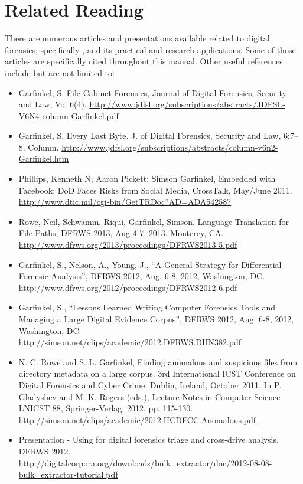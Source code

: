 \documentclass[11pt]{article} %
\begin{document}
\section{Related Reading}
There are numerous articles and presentations available related to digital forensics, specifically \bulk, and its practical and research applications. Some of those articles are specifically cited throughout this manual. Other useful references include but are not limited to:
\begin{itemize}
\item Garfinkel, S. File Cabinet Forensics, Journal of Digital Forensics, Security and Law, Vol 6(4). \url{http://www.jdfsl.org/subscriptions/abstracts/JDFSL-V6N4-column-Garfinkel.pdf}
\item Garfinkel, S. Every Last Byte. J. of Digital Forensics, Security and Law, 6:7–8. Column. \url{http://www.jdfsl.org/subscriptions/abstracts/column-v6n2-Garfinkel.htm}
\item Phillips, Kenneth N; Aaron Pickett; Simson Garfinkel, Embedded with Facebook: DoD Faces Risks from Social Media, CrossTalk, May/June 2011. \url{http://www.dtic.mil/cgi-bin/GetTRDoc?AD=ADA542587}
\item Rowe, Neil, Schwamm, Riqui, Garfinkel, Simson. Language Translation for File Paths, DFRWS 2013, Aug 4-7, 2013. Monterey, CA. \url{http://www.dfrws.org/2013/proce}\newline\url{edings/DFRWS2013-5.pdf}
\item Garfinkel, S., Nelson, A., Young, J., ``A General Strategy for Differential Forensic Analysis'', DFRWS 2012, Aug. 6-8, 2012, Washington, DC. \url{http://www.dfrws.org/2012/proceedings/DFRWS2012-6.pdf}
\item Garfinkel, S., ``Lessons Learned Writing Computer Forensics Tools and Managing a Large Digital Evidence Corpus'', DFRWS 2012, Aug. 6-8, 2012, Washington, DC. \url{http://simson.net/clips/academic/2012.DFRWS.DIIN382.pdf}
\item N. C. Rowe and S. L. Garfinkel, Finding anomalous and suspicious files from directory metadata on a large corpus. 3rd International ICST Conference on Digital Forensics and Cyber Crime, Dublin, Ireland, October 2011. In P. Gladyshev and M. K. Rogers (eds.), Lecture Notes in Computer Science LNICST 88, Springer-Verlag, 2012, pp. 115-130. \url{http://simson.net/clips/academic/2012.IICDFCC.Anomalous.pdf}
\item Presentation - Using \bulk for digital forensics triage and cross-drive analysis, DFRWS 2012. \url{http://digitalcorpora.org/downloads/bulk_extractor/doc/2012-08-08-bulk_extractor-tutorial.pdf}

\end{itemize}
\end{document}
